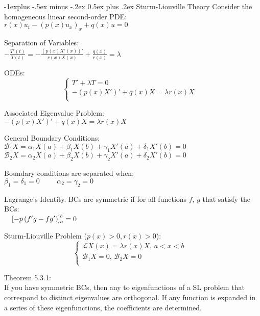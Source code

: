 \documentclass[12pt,landscape]{article}
\makeatletter
\renewcommand{\subsection}{\@startsection{subsection}{2}{0mm}%
                                {-1explus -.5ex minus -.2ex}%
                                {0.5ex plus .2ex}%
                                {\normalfont\small\bfseries}}
\newcommand{\tab}{\hspace*{1em}}
\newcommand{\ds}{\displaystyle}
\theoremstyle{definition}
\makeatother
\begin{document}
\begin{multicols*}{3}
\subsection{Sturm-Liouville Theory}
Consider the homogeneous linear second-order PDE:\\
\tab $r(x)u_t - (p(x)u_x)_x + q(x)u = 0$

Separation of Variables:\\
\tab $\ds -\frac{T'(t)}{T(t)} = -\frac{(p(x)X'(x))'}{r(x)X(x)} + \frac{q(x)}{r(x)} = \lambda$

ODEs:
\begin{equation*}
\begin{cases}
T' + \lambda T = 0 &\\
-(p(x)X')' + q(x)X = \lambda r(x)X &\\
\end{cases}
\end{equation*}

Associated Eigenvalue Problem:\\
\tab $-(p(x)X')' + q(x)X = \lambda r(x) X$

General Boundary Conditions:\\
\tab $\mathcal{B}_1X = \alpha_1 X(a) + \beta_1 X(b) + \gamma_1 X'(a) + \delta_1 X'(b) = 0$\\
\tab $\mathcal{B}_2X = \alpha_2 X(a) + \beta_2 X(b) + \gamma_2 X'(a) + \delta_2 X'(b) = 0$

Boundary conditions are separated when:\\
\tab $\beta_1 = \delta_1 = 0 \hspace{1cm} \alpha_2 = \gamma_2 = 0$

Lagrange's Identity. BCs are symmetric if for all functions $f$, $g$ that satisfy the BCs:\\
\tab $\tab \left[-p\left(f'g - fg'\right)\right]_a^b = 0$

Sturm-Liouville Problem ($p(x) > 0, r(x) > 0$):
\begin{equation*}
\begin{cases}
\mathcal{L}X(x) = \lambda r(x)X, \, a < x < b &\\
\mathcal{B}_1 X = 0, \,\mathcal{B}_2 X = 0&\\
\end{cases}
\end{equation*}

Theorem 5.3.1:\\
\tab If you have symmetric BCs, then any to eigenfunctions of a SL problem that correspond to distinct eigenvalues are orthogonal. If any function is expanded in a series of these eigenfunctions, the coefficients are determined.


\end{multicols*}
\end{document}
